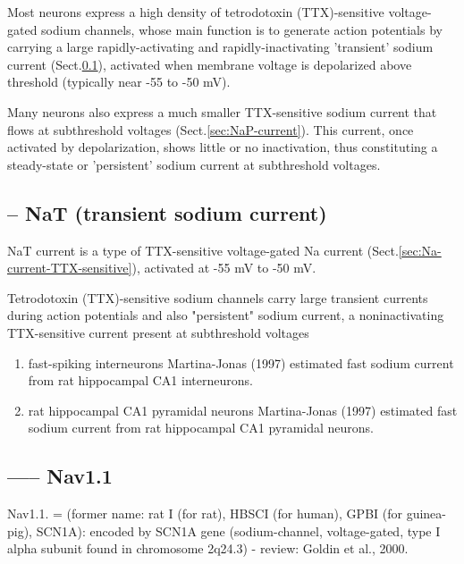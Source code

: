 Most neurons express a high density of tetrodotoxin (TTX)-sensitive
voltage-gated sodium channels, whose main function is to generate action
potentials by carrying a large rapidly-activating and rapidly-inactivating
'transient' sodium current (Sect.\ref{sec:NaT-current}), activated when membrane
voltage is depolarized above threshold (typically near -55 to -50 mV).

Many neurons also express a much smaller TTX-sensitive sodium current that flows
at subthreshold voltages (Sect.\ref{sec:NaP-current}).
This current, once activated by depolarization, shows little or no inactivation,
thus constituting a steady-state or 'persistent' sodium current at subthreshold
voltages.



\subsection{-- NaT (transient sodium current)}
\label{sec:NaT-current}

NaT current is a type of TTX-sensitive voltage-gated Na current
(Sect.\ref{sec:Na-current-TTX-sensitive}), activated at -55 mV to -50 mV.

Tetrodotoxin (TTX)-sensitive sodium channels carry large transient currents
during action potentials and also "persistent" sodium current, a noninactivating
TTX-sensitive current present at subthreshold voltages

\begin{enumerate}
  \item fast-spiking interneurons
\label{sec:Martina-Jonas-1997}
Martina-Jonas (1997) estimated fast sodium current from rat hippocampal CA1
interneurons.
  

  \item rat hippocampal CA1 pyramidal neurons
\label{sec:Martina-Jonas-1997}
Martina-Jonas (1997) estimated fast sodium current from rat hippocampal CA1
pyramidal neurons.
  
\end{enumerate}


\subsection{----- Nav1.1}
\label{sec:Nav1.1}

Nav1.1. = (former name: rat I (for rat), HBSCI (for human), GPBI (for
guinea-pig), SCN1A): encoded by SCN1A gene (sodium-channel, voltage-gated, type
I alpha subunit found in chromosome 2q24.3) - review: Goldin et al., 2000.

